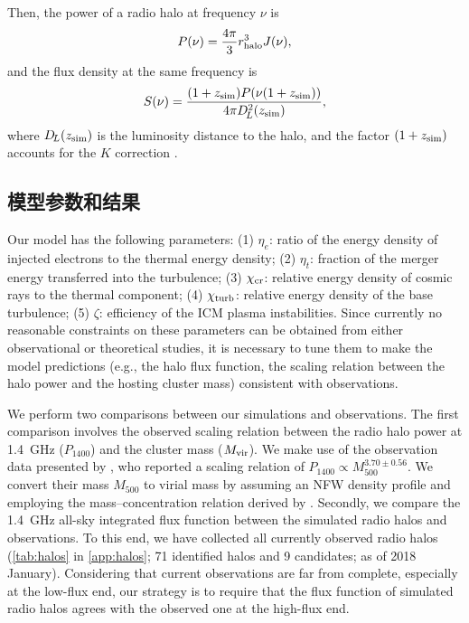 Then, the power of a radio halo at frequency $\nu$ is
\begin{equation}
  \label{eq:halo-power}
  P(\nu) = \frac{4\pi}{3} r_{\mathrm{halo}}^3 J(\nu),
\end{equation}
and the flux density at the same frequency is
\begin{equation}
  \label{eq:halo-flux}
  S(\nu) = \frac{(1+z_{\mathrm{sim}}) P(\nu(1+z_{\mathrm{sim}}))}
    {4\pi D_{\!L}^2(z_{\mathrm{sim}})} ,
\end{equation}
where $D_{\!L}(z_{\mathrm{sim}})$ is the luminosity distance to the halo,
and the factor $(1 + z_{\mathrm{sim}})$ accounts for the $K$ correction
\cite{hogg1999}.

\subsection{模型参数和结果}
\label{sec:halo-results}

Our model has the following parameters:
(1) $\eta_e$: ratio of the energy density of injected electrons to the
thermal energy density;
(2) $\eta_t$: fraction of the merger energy transferred into the
turbulence;
(3) $\chi_{\mathrm{cr}}$: relative energy density of cosmic rays to the thermal
component;
(4) $\chi_{\mathrm{turb}}$: relative energy density of the base turbulence;
(5) $\zeta$: efficiency of the ICM plasma instabilities.
Since currently no reasonable constraints on these parameters can be
obtained from either observational or theoretical studies,
it is necessary to tune them to make the model predictions (e.g., the halo
flux function, the scaling relation between the halo power and the hosting
cluster mass) consistent with observations.

We perform two comparisons between our simulations and observations.
The first comparison involves the observed scaling relation between the
radio halo power at \SI{1.4}{\GHz} ($P_{1400}$) and the cluster mass
($M_{\mathrm{vir}}$).
We make use of the observation data presented by ,
who reported a scaling relation of
$P_{1400} \propto M_{500}^{3.70 \pm 0.56}$.
We convert their mass $M_{500}$ to virial mass by assuming an NFW density
profile \cite{navarro1997} and employing the mass--concentration relation
derived by .
Secondly,
we compare the \SI{1.4}{\GHz} all-sky integrated flux function between
the simulated radio halos and observations.
To this end, we have collected all currently observed radio halos
(\autoref{tab:halos} in \autoref{app:halos};
71 identified halos and 9 candidates; as of 2018 January).
Considering that current observations are far from complete,
especially at the low-flux end, our strategy is to require that the
flux function of simulated radio halos agrees with the
observed one at the high-flux end.

